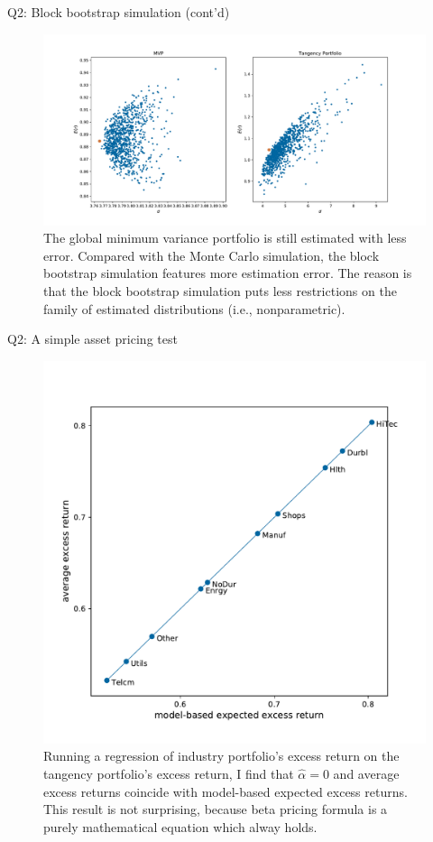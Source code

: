 \documentclass[10pt,t]{beamer}
\begin{document}
\begin{frame}{Q2: Block bootstrap simulation (cont'd)}
\begin{figure}[h!]
\centering
\includegraphics[width=\linewidth]{q2fig3.pdf}
\caption{The global minimum variance portfolio is still estimated with less error. Compared with the Monte Carlo simulation, the block bootstrap simulation features more estimation error. The reason is that the block bootstrap simulation puts less restrictions on the family of estimated distributions (i.e., nonparametric).}
\end{figure}
\end{frame}


\begin{frame}{Q2: A simple asset pricing test}
\begin{figure}[h!]
\centering
\includegraphics[width=0.5\linewidth]{q2fig4.pdf}
\caption{Running a regression of industry portfolio's excess return on the tangency portfolio's excess return, I find that $\hat{\alpha} = 0$ and average excess returns coincide with model-based expected excess returns. This result is not surprising, because beta pricing formula is a purely mathematical equation which alway holds.}
\end{figure}
\end{frame}
\end{document}
